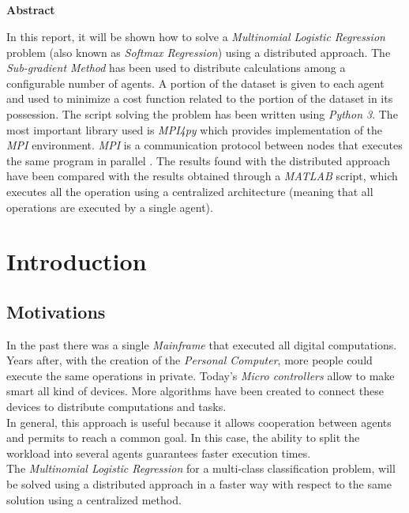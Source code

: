 \documentclass[a4paper,11pt,oneside]{book}
\begin{document}
\pagestyle{myheadings}



\newpage
\thispagestyle{empty}

\begin{center}
\chapter*{}
\thispagestyle{empty}
{\Huge \textbf{Abstract}}\\
\vspace{15mm}
\end{center}
In this report, it will be shown how to solve a \textit{Multinomial Logistic Regression} problem (also known as \textit{Softmax Regression}) using a distributed approach. The \textit{Sub-gradient Method} has been used to distribute calculations among a configurable number of agents. A portion of the dataset is given to each agent and used to minimize a cost function related to the portion of the dataset in its possession.
The script solving the problem has been written using \textit{Python 3}. The most important library used is \textit{MPI4py} which provides implementation of the \textit{MPI} environment. \textit{MPI} is a communication protocol between nodes that executes the same program in parallel \cite{CITATION:4}. The results found with the distributed approach have been compared with the results obtained through a \textit{MATLAB} script, which executes all the operation using a centralized architecture (meaning that all operations are executed by a single agent).\\


\tableofcontents \thispagestyle{empty}
\listoffigures\thispagestyle{empty}

\chapter*{Introduction}

\section*{Motivations}
In the past there was a single \textit{Mainframe} that executed all digital computations. Years after, with the creation of the \textit{Personal Computer}, more people could execute the same operations in private. Today's \textit{Micro controllers} allow to make smart all kind of devices. More algorithms have been created to connect these devices to distribute computations and tasks.\\
 In general, this approach is useful because it allows cooperation between agents and permits to reach a common goal. In this case, the ability to split the workload into several agents guarantees faster execution times.\\
The \textit{Multinomial Logistic Regression} for a multi-class classification problem, will be solved using a distributed approach in a faster way with respect to the same solution using a centralized method.
\end{document}
